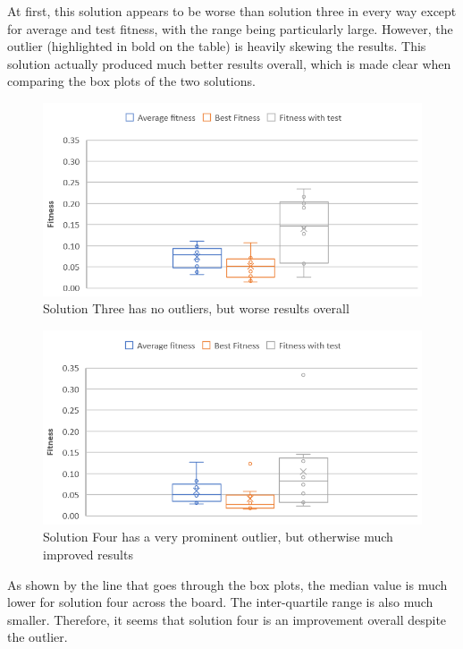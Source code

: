 \documentclass[sigconf]{acmart}
\begin{document}
At first, this solution appears to be worse than solution three in every way except for average and test fitness, with the range being particularly large. However, the outlier (highlighted in bold on the table) is heavily skewing the results. This solution actually produced much better results overall, which is made clear when comparing the box plots of the two solutions.

\begin{figure}[H]
\includegraphics[width=\columnwidth]{SolThreeBox.png}
\caption[width=\columnwidth]{Solution Three has no outliers, but worse results overall} \label{SolThreeBox}
\end{figure}

\begin{figure}[H]
\includegraphics[width=\columnwidth]{SolFourBox.png}
\caption[width=\columnwidth]{Solution Four has a very prominent outlier, but otherwise much improved results} \label{SolFourBox}
\end{figure}

As shown by the line that goes through the box plots, the median value is much lower for solution four across the board. The inter-quartile range is also much smaller. Therefore, it seems that solution four is an improvement overall despite the outlier.
\end{document}
